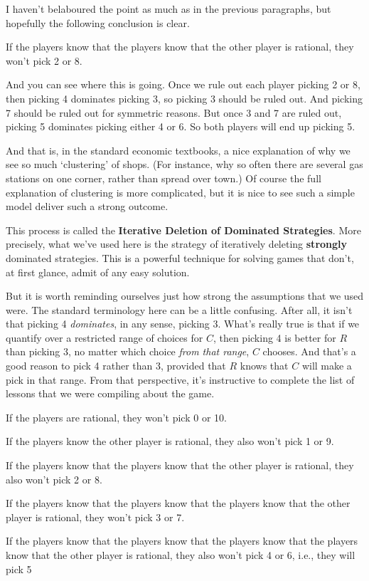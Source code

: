 I haven't belaboured the point as much as in the previous paragraphs, but hopefully the following conclusion is clear.

\begin{itemize*}
\item If the players know that the players know that the other player is rational, they won't pick 2 or 8.
\end{itemize*}

\noindent And you can see where this is going. Once we rule out each player picking 2 or 8, then picking 4 dominates picking 3, so picking 3 should be ruled out. And picking 7 should be ruled out for symmetric reasons. But once 3 and 7 are ruled out, picking 5 dominates picking either 4 or 6. So both players will end up picking 5.

And that is, in the standard economic textbooks, a nice explanation of why we see so much `clustering' of shops. (For instance, why so often there are several gas stations on one corner, rather than spread over town.) Of course the full explanation of clustering is more complicated, but it is nice to see such a simple model deliver such a strong outcome. 

This process is called the \textbf{Iterative Deletion of Dominated Strategies}. More precisely, what we've used here is the strategy of iteratively deleting \textbf{strongly} dominated strategies. This is a powerful technique for solving games that don't, at first glance, admit of any easy solution.

But it is worth reminding ourselves just how strong the assumptions that we used were. The standard terminology here can be a little confusing. After all, it isn't that picking 4 \textit{dominates}, in any sense, picking 3. What's really true is that if we quantify over a restricted range of choices for $C$, then picking 4 is better for $R$ than picking 3, no matter which choice \textit{from that range}, $C$ chooses. And that's a good reason to pick 4 rather than 3, provided that $R$ knows that $C$ will make a pick in that range. From that perspective, it's instructive to complete the list of lessons that we were compiling about the game.

\begin{itemize*}
\item If the players are rational, they won't pick 0 or 10.
\item If the players know the other player is rational, they also won't pick 1 or 9.
\item If the players know that the players know that the other player is rational, they also won't pick 2 or 8.
\item If the players know that the players know that the players know that the other player is rational, they won't pick 3 or 7.
\item If the players know that the players know that the players know that the players know that the other player is rational, they also won't pick 4 or 6, i.e., they will pick 5
\end{itemize*}

